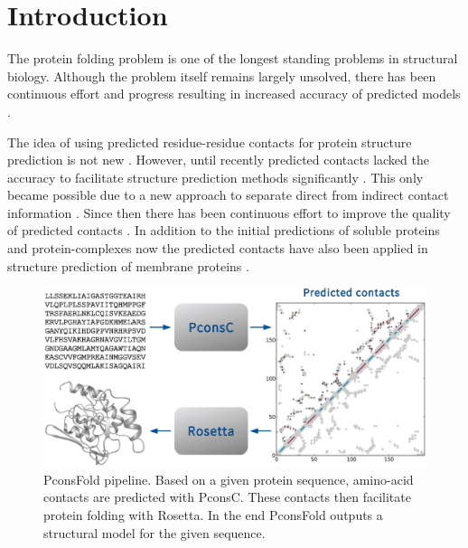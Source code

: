 \documentclass{bioinfo}
\begin{document}
\section{Introduction}
The protein folding problem is one of the longest standing problems in
structural biology. Although the problem itself remains largely unsolved,
there has been continuous effort and progress resulting in increased
accuracy of predicted models
\cite[]{kryshtafovych_CASP10_2013}. 

The idea of using predicted residue-residue contacts for protein
structure prediction is not new \cite[]{Vendruscolo9377713}. However,
until recently predicted contacts lacked the accuracy to facilitate
structure prediction methods significantly
\cite[]{marks_protein_2011}. This only became possible due to a new
approach to separate direct from indirect contact information
\cite[]{Weigt19116270,burger_disentangling_2010}.  Since then there
has been continuous effort to improve the quality of predicted
contacts \cite[]{morcos_direct-coupling_2011, jones_PSICOV:_2012,
  ekeberg_improved_2013, skwark_PconsC:_2013}.  In addition to the
initial predictions of soluble proteins \cite[]{marks_protein_2011}
and protein-complexes \cite{Schug20018738} now the predicted contacts
have also been applied in structure prediction of membrane proteins
\cite[]{hopf_three-dimensional_2012, nugent_accurate_2012}.


\begin{figure}[!tpb]%
\centerline{\includegraphics[scale=0.35]{figures/pipeline.eps}}
\caption{PconsFold pipeline. Based on a given protein sequence,
  amino-acid contacts are predicted with PconsC. These contacts then
  facilitate protein folding with Rosetta. In the end PconsFold
  outputs a structural model for the given
  sequence.}\label{fig:pipeline} 
\end{figure}
\end{document}
